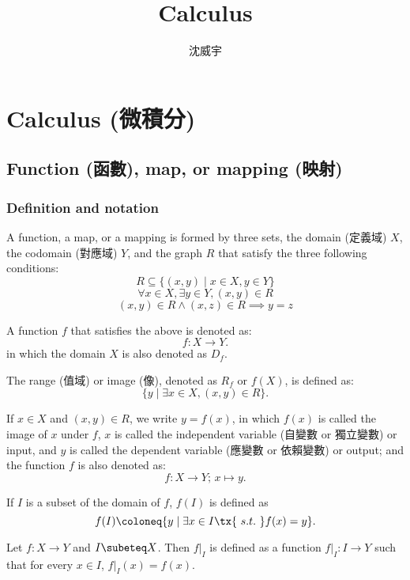 \documentclass[a4paper,12pt]{report}
\begin{document}
\title{Calculus}
\author{沈威宇}
\date{\temtoday}
\titletocdoc
\chapter{Calculus (微積分)}
\section{Function (函數), map, or mapping (映射)}
\subsection{Definition and notation}
A function, a map, or a mapping is formed by three sets, the domain (定義域) $X$, the codomain (對應域) $Y$, and the graph $R$ that satisfy the three following conditions:
\[R\subseteq \{(x,y)\mid x\in X,y\in Y\}\]
\[\forall x\in X,\exists y\in Y,\left(x,y\right)\in R \]
\[ (x,y)\in R\land (x,z)\in R\implies y=z\]

A function $f$ that satisfies the above is denoted as:
\[f\colon X\to Y.\]
in which the domain $X$ is also denoted as $D_f$.

The range (值域) or image (像), denoted as $R_f$ or $f(X)$, is defined as:
\[\{ y \mid \exists x \in X, (x, y) \in R \}.\]

If $x\in X$ and $(x, y) \in R$, we write $y = f(x)$, in which $f(x)$ is called the image of $x$ under $f$, $x$ is called the independent variable (自變數 or 獨立變數) or input, and $y$ is called the dependent variable (應變數 or 依賴變數) or output; and the function $f$ is also denoted as:
\[f \colon X \to Y;\, x \mapsto y.\]

If $I$ is a subset of the domain of $f$, $f(I)$ is defined as
\[f(I)\coloneq\{y\mid\exists x\in I \tx{\ s.t.\ }f(x)=y\}.\]

Let $f\colon X\to Y$ and $I\subeteq X$. Then $f\vert_I$ is defined as a function $f\vert_I\colon I\to Y$ such that for every $x\in I$, $f\vert_I(x)=f(x)$.
\end{document}
